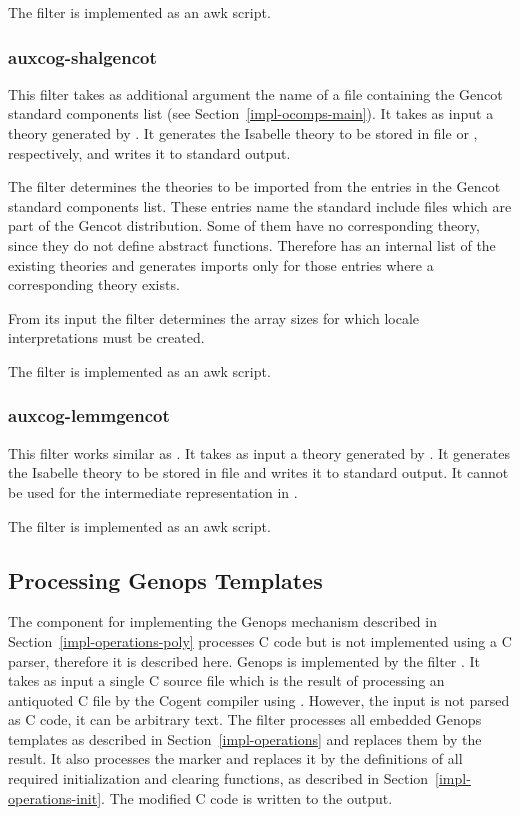 The filter is implemented as an awk script.

\subsubsection{auxcog-shalgencot}

This filter takes as additional argument the name of a file containing the Gencot standard components list (see 
Section~\ref{impl-ocomps-main}). It takes as input a theory generated by . 
It generates the Isabelle theory to be stored in file 
or , respectively, and writes it to standard output.

The filter determines the theories to be imported from the entries  in the Gencot standard
components list. These entries name the standard include files which are part of the Gencot distribution. Some
of them have no corresponding theory, since they do not define abstract functions. Therefore 
has an internal list of the existing theories and generates imports only for those entries where a corresponding 
theory exists.

From its input the filter determines the array sizes for which locale interpretations must be created.

The filter is implemented as an awk script.

\subsubsection{auxcog-lemmgencot}

This filter works similar as . It takes as input a theory generated by . 
It generates the Isabelle theory to be stored in file 
 and writes it to standard output. It cannot be used for the intermediate
representation in .

The filter is implemented as an awk script.

\subsection{Processing Genops Templates}
\label{impl-ocomps-genops}

The component for implementing the Genops mechanism described in Section~\ref{impl-operations-poly} processes C code but
is not implemented using a C parser, therefore it is described here. Genops is implemented by the filter .
It takes as input a single C source file which is the result of processing an antiquoted C file by the Cogent compiler
using . However, the input is not parsed as C code, it can be arbitrary text. The filter processes
all embedded Genops templates as described in Section~\ref{impl-operations} and replaces them by the result. It also 
processes the  marker and replaces it by the definitions of all required initialization
and clearing functions, as described in Section~\ref{impl-operations-init}. The modified C code is written to the output.

